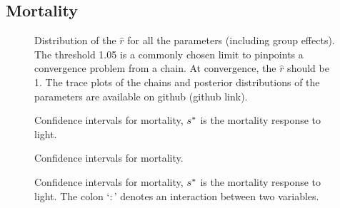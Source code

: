 \subsection{Mortality}
\begin{figure}
	\centering
	
	\caption{Distribution of the $ \hat{r} $ for all the parameters (including group effects). The threshold 1.05 is a commonly chosen limit to pinpoints a convergence problem from a chain. At convergence, the $ \hat{r} $ should be 1. The trace plots of the chains and posterior distributions of the parameters are available on github (github link). \label{fig::rhat_conv}}
\end{figure}
\begin{figure}
	\centering
	
	\caption{Confidence intervals for mortality, $ {s}^{*} $ is the mortality response to light. \label{fig::confInt_m_1}}
\end{figure}
\begin{figure}
	\centering
	
	\caption{Confidence intervals for mortality. \label{fig::confInt_m_2}}
\end{figure}
\begin{figure}
	\centering
	
	\caption{Confidence intervals for mortality, $ {s}^{*} $ is the mortality response to light. The colon `$ : $' denotes an interaction between two variables. \label{fig::confInt_m_3}}
\end{figure}
